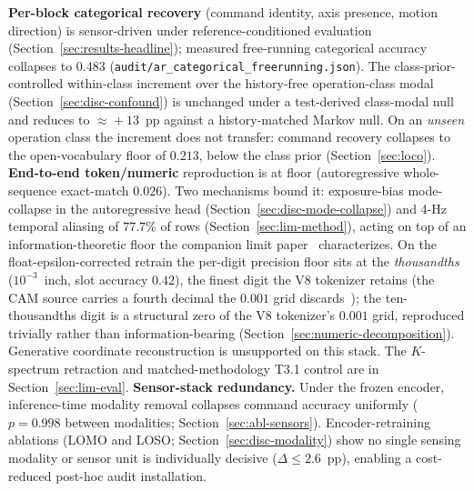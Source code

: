 \documentclass[sensors,article,submit,moreauthors,pdftex]{Definitions/mdpi}
\begin{document}
\begin{enumerate}[label=(\arabic*), leftmargin=*, itemsep=2pt]\let\item\olditem
\item \textbf{Per-block categorical recovery} (command identity, axis presence, motion direction) is sensor-driven under reference-conditioned evaluation (Section~\ref{sec:results-headline}); measured free-running categorical accuracy collapses to $0.483$ (\texttt{audit/ar\_categorical\_freerunning.json}). The class-prior-controlled within-class increment over the history-free operation-class modal (Section~\ref{sec:disc-confound}) is unchanged under a test-derived class-modal null and reduces to $\approx\!+13$~pp against a history-matched Markov null. On an \emph{unseen} operation class the increment does not transfer: command recovery collapses to the open-vocabulary floor of $0.213$, below the class prior (Section~\ref{sec:loco}).
\item \textbf{End-to-end token/numeric} reproduction is at floor (autoregressive whole-sequence exact-match $0.026$). Two mechanisms bound it: exposure-bias mode-collapse in the autoregressive head (Section~\ref{sec:disc-mode-collapse}) and 4-Hz temporal aliasing of $77.7\%$ of rows (Section~\ref{sec:lim-method}), acting on top of an information-theoretic floor the companion limit paper~\cite{paperB_entropy} characterizes. On the float-epsilon-corrected retrain the per-digit precision floor sits at the \emph{thousandths} ($10^{-3}$~inch, slot accuracy $0.42$), the finest digit the V8 tokenizer retains (the CAM source carries a fourth decimal the $0.001$ grid discards~\cite{paperB_entropy}); the ten-thousandths digit is a structural zero of the V8 tokenizer's $0.001$ grid, reproduced trivially rather than information-bearing (Section~\ref{sec:numeric-decomposition}). Generative coordinate reconstruction is unsupported on this stack. The $K$-spectrum retraction and matched-methodology T3.1 control are in Section~\ref{sec:lim-eval}.
\item \textbf{Sensor-stack redundancy.} Under the frozen encoder, inference-time modality removal collapses command accuracy uniformly ($p\!=\!0.998$ between modalities; Section~\ref{sec:abl-sensors}). Encoder-retraining ablations (LOMO and LOSO; Section~\ref{sec:disc-modality}) show no single sensing modality or sensor unit is individually decisive ($\Delta\!\le\!2.6$~pp), enabling a cost-reduced post-hoc audit installation.
\end{enumerate}
\end{document}

